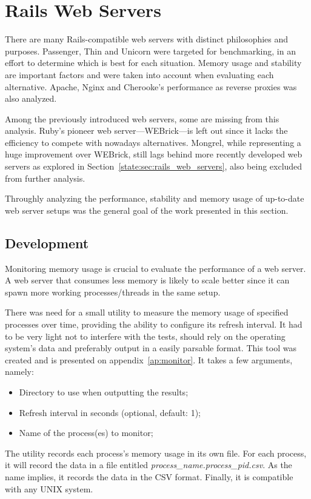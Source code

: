 \section{Rails Web Servers} %
\label{solution:sec:rails_web_servers}
There are many Rails-compatible web servers with distinct philosophies and purposes. Passenger, Thin and Unicorn were targeted for benchmarking, in an effort to determine which is best for each situation. Memory usage and stability are important factors and were taken into account when evaluating each alternative. Apache, Nginx and Cherooke's performance as reverse proxies was also analyzed.

Among the previously introduced web servers, some are missing from this analysis. Ruby's pioneer web server---WEBrick---is left out since it lacks the efficiency to compete with nowadays alternatives. Mongrel, while representing a huge improvement over WEBrick, still lags behind more recently developed web servers as explored in Section~\ref{state:sec:rails_web_servers}, also being excluded from further analysis.

Throughly analyzing the performance, stability and memory usage of up-to-date web server setups was the general goal of the work presented in this section.

\subsection{Development}
Monitoring memory usage is crucial to evaluate the performance of a web server. A web server that consumes less memory is likely to scale better since it can spawn more working processes/threads in the same setup.

There was need for a small utility to measure the memory usage of specified processes over time, providing the ability to configure its refresh interval. It had to be very light not to interfere with the tests, should rely on the operating system's data and preferably output in a easily parsable format. This tool was created and is presented on appendix~\ref{ap:monitor}. It takes a few arguments, namely:
\begin{itemize}
  \item Directory to use when outputting the results;
  \item Refresh interval in seconds (optional, default: 1);
  \item Name of the process(es) to monitor;
\end{itemize}
The utility records each process's memory usage in its own file. For each process, it will record the data in a file entitled \textit{process\_name.process\_pid.csv}. As the name implies, it records the data in the CSV format. Finally, it is compatible with any UNIX system.

